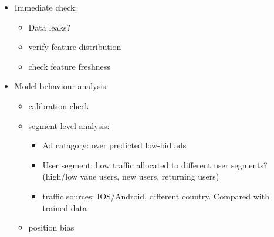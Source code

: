 \begin{itemize}
    \item Immediate check:
    \begin{itemize}
        \item Data leaks?
        \item verify feature distribution
        \item check feature freshness 
    \end{itemize}

    \item Model behaviour analysis
    \begin{itemize}
        \item calibration check
        \item segment-level analysis:
        \begin{itemize}
            \item Ad catagory: over predicted low-bid ads
            \item User segment: how traffic allocated to different user segments? (high/low vaue users, new users, returning users)
            \item traffic sources: IOS/Android, different country. Compared with trained data
        \end{itemize}
        \item position bias
    \end{itemize} 


\end{itemize}
